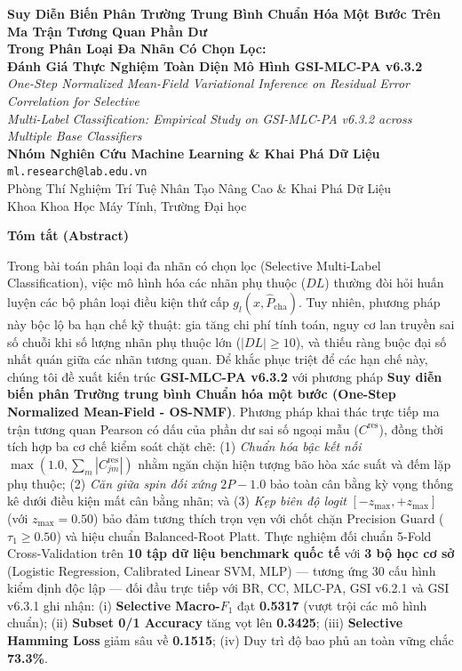 \documentclass[10pt,a4paper,twoside]{article}
\begin{document}
\thispagestyle{firstpage}

\begin{center}
    {\LARGE\bfseries Suy Diễn Biến Phân Trường Trung Bình Chuẩn Hóa Một Bước Trên Ma Trận Tương Quan Phần Dư\\ Trong Phân Loại Đa Nhãn Có Chọn Lọc:\\[0.3em] Đánh Giá Thực Nghiệm Toàn Diện Mô Hình GSI-MLC-PA v6.3.2}\\[0.6em]
    {\large\textit{One-Step Normalized Mean-Field Variational Inference on Residual Error Correlation for Selective\\ Multi-Label Classification: Empirical Study on GSI-MLC-PA v6.3.2 across Multiple Base Classifiers}}\\[0.9em]
    {\textbf{Nhóm Nghiên Cứu Machine Learning \& Khai Phá Dữ Liệu}}\\[0.2em]
    {\texttt{ml.research@lab.edu.vn}}\\[0.2em]
    {\small Phòng Thí Nghiệm Trí Tuệ Nhân Tạo Nâng Cao \& Khai Phá Dữ Liệu}\\[0.1em]
    {\small Khoa Khoa Học Máy Tính, Trường Đại học}\\[0.8em]
\end{center}

\begin{center}\textbf{Tóm tắt (Abstract)}\end{center}
Trong bài toán phân loại đa nhãn có chọn lọc (Selective Multi-Label Classification), việc mô hình hóa các nhãn phụ thuộc ($DL$) thường đòi hỏi huấn luyện các bộ phân loại điều kiện thứ cấp $g_l(x, \hat{P}_{\text{cha}})$. Tuy nhiên, phương pháp này bộc lộ ba hạn chế kỹ thuật: gia tăng chi phí tính toán, nguy cơ lan truyền sai số chuỗi khi số lượng nhãn phụ thuộc lớn ($|DL| \ge 10$), và thiếu ràng buộc đại số nhất quán giữa các nhãn tương quan. Để khắc phục triệt để các hạn chế này, chúng tôi đề xuất kiến trúc \textbf{GSI-MLC-PA v6.3.2} với phương pháp \textbf{Suy diễn biến phân Trường trung bình Chuẩn hóa một bước (One-Step Normalized Mean-Field - OS-NMF)}. Phương pháp khai thác trực tiếp ma trận tương quan Pearson có dấu của phần dư sai số ngoại mẫu ($C^{\text{res}}$), đồng thời tích hợp ba cơ chế kiểm soát chặt chẽ: (1) \textit{Chuẩn hóa bậc kết nối} $\max(1.0, \sum_m |C^{\text{res}}_{jm}|)$ nhằm ngăn chặn hiện tượng bão hòa xác suất và đếm lặp phụ thuộc; (2) \textit{Căn giữa spin đối xứng} $2P - 1.0$ bảo toàn cân bằng kỳ vọng thống kê dưới điều kiện mất cân bằng nhãn; và (3) \textit{Kẹp biên độ logit} $[-z_{\max}, +z_{\max}]$ (với $z_{\max} = 0.50$) bảo đảm tương thích trọn vẹn với chốt chặn Precision Guard ($\tau_1 \ge 0.50$) và hiệu chuẩn Balanced-Root Platt. Thực nghiệm đối chuẩn 5-Fold Cross-Validation trên \textbf{10 tập dữ liệu benchmark quốc tế} với \textbf{3 bộ học cơ sở} (Logistic Regression, Calibrated Linear SVM, MLP) --- tương ứng 30 cấu hình kiểm định độc lập --- đối đầu trực tiếp với BR, CC, MLC-PA, GSI v6.2.1 và GSI v6.3.1 ghi nhận: (i) \textbf{Selective Macro-$F_1$} đạt \textbf{0.5317} (vượt trội các mô hình chuẩn); (ii) \textbf{Subset 0/1 Accuracy} tăng vọt lên \textbf{0.3425}; (iii) \textbf{Selective Hamming Loss} giảm sâu về \textbf{0.1515}; (iv) Duy trì độ bao phủ an toàn vững chắc \textbf{73.3\%}.
\end{document}
